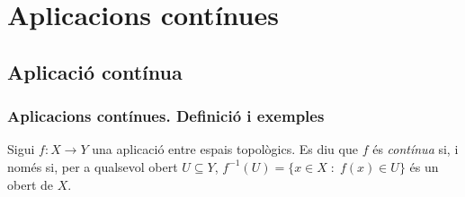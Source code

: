 \documentclass[../main.tex]{subfiles}
\begin{document}
\chapter{Aplicacions contínues}



\section{Aplicació contínua}
\subsection{Aplicacions contínues. Definició i exemples}
\begin{defi}
\label{def:appcontinuaesptop} Sigui $f:X\rightarrow Y$ una aplicació entre espais topològics. Es diu que $f$ és \textit{contínua} si, i només si, per a qualsevol obert $U\subseteq Y$, $f^{-1}(U) = \{x\in X\;:\;f(x)\in U\}$ és un obert de $X$.
\end{defi}
\end{document}
